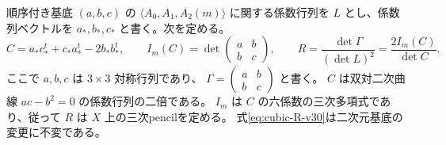 順序付き基底 $(a,b,c)$ の $\langle A_0,A_1,A_2(m)\rangle$ に関する係数行列を
$L$ とし、係数列ベクトルを $a_*,b_*,c_*$ と書く。次を定める。
\begin{equation}\label{eq:cubic-R-v30}
 C=a_*c_*^t+c_*a_*^t-2b_*b_*^t,\qquad
 I_m(C)=\det\begin{pmatrix}a&b\\b&c\end{pmatrix},\qquad
 R=\frac{\det\Gamma}{(\det L)^2}=\frac{2I_m(C)}{\det C}.
\end{equation}
ここで $a,b,c$ は $3\times3$ 対称行列であり、
$\Gamma=\left(\begin{smallmatrix}a&b\\b&c\end{smallmatrix}\right)$ と書く。
$C$ は双対二次曲線 $ac-b^2=0$ の係数行列の二倍である。
$I_m$ は $C$ の六係数の三次多項式であり、従って $R$ は $X$ 上の三次pencilを定める。
式\eqref{eq:cubic-R-v30}は二次元基底の変更に不変である。

